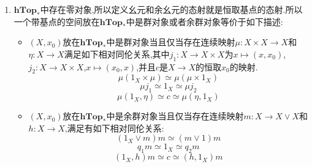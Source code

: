 \begin{enumerate}
\begin{proof}
    	二元积:如果带基点的连续映射$f_1:X\to C_1$和$f_2:X\to C_2$,把它们替换为同伦的映射,那么诱导的$X\to C_1\times C_2$也是同伦的.只要取同伦的乘积.
    	
    	\qquad
    	
    	二元余积:如果同伦$f_1\sim f_1':C_1\to X$记作$H_1$,同伦$f_2\sim f_2':C_2\to X$记作$H_2$,考虑如下$(C_1\vee C_2)\times[0,1]\to X$映射:
    	$$H(x,t)=\left\{\begin{array}{cc}H_1(x,t)&x\in C_1\\H_2(x,t)&x\in C_2\end{array}\right.$$
    	
    	这是连续映射因为它是如下映射$H_1\coprod H_2$在商空间中的提升:
    	$$\xymatrix{(C_1\vee C_2)\times[0,1]\ar[rr]&&X\\(C_1\times[0,1])\coprod(C_2\times[0,1])\ar[u]\ar@/_1pc/[urr]_{\qquad H_1\coprod H_2}&&}$$
    \end{proof}
    \item $\textbf{hTop}_*$中存在零对象,所以定义幺元和余幺元的态射就是恒取基点的态射.所以一个带基点的空间放在$\textbf{hTop}_*$中是群对象或者余群对象等价于如下描述:
    \begin{itemize}
    	\item $(X,x_0)$放在$\textbf{hTop}_*$中是群对象当且仅当存在连续映射$\mu:X\times X\to X$和$\eta:X\to X$满足如下相对同伦关系,其中$j_1:X\to X\times X$为$x\mapsto(x,x_0)$,$j_2:X\to X\times X$,$x\mapsto(x_0,x)$,并且$c$是$X\to X$的恒取$x_0$的映射.
    	$$\mu(1_X\times\mu)\simeq\mu(\mu\times1_X)$$
    	$$\mu j_1\simeq 1_X\simeq\mu j_2$$
    	$$\mu(1_X,\eta)\simeq c\simeq\mu(\eta,1_X)$$
    	\item $(X,x_0)$放在$\textbf{hTop}_*$中是余群对象当且仅当存在连续映射$m:X\to X\vee X$和$h:X\to X$,满足有如下相对同伦关系:
    	$$(1_X\vee m)m\simeq(m\vee 1)m$$
    	$$q_1m\simeq 1_X\simeq q_2m$$
    	$$(1_X,h)m\simeq c\simeq(h,1_X)m$$
    \end{itemize}
\end{enumerate}

